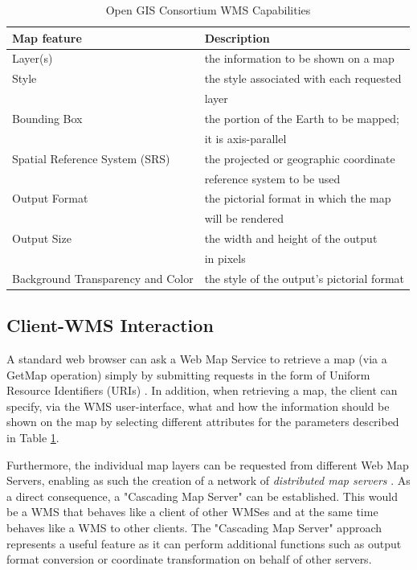 \documentclass[a4paper,11pt,openany,notitlepage]{article}
\begin{document}
\begin{table}[h]
	\centering						
		\begin{tabular}{||l|l||} \hline \hline
			\textbf{Map feature}	& \textbf{Description}	\\ \hline \hline
			Layer(s)	& the information to be shown on a map \\ \hline
			Style		& the style associated with each requested	\\
			&	layer	\\ \hline
			Bounding Box		& the portion of the Earth to be mapped;	\\
			& it is axis-parallel \\ \hline
			Spatial Reference System (SRS)		& the projected or geographic coordinate \\
			&	reference system to be used	\\ \hline				
			Output Format		& the pictorial format in which the map	\\
			&	will be rendered	\\ \hline
			Output Size		& the width and height of the output \\
			&	in pixels	\\ \hline
			Background Transparency and Color	& the style of the output's pictorial format \\ \hline \hline
		\end{tabular}
		\caption{Open GIS Consortium WMS Capabilities}		
		\label{tab:def}
\end{table}

\subsection{Client-WMS Interaction} \label{subsec:interaction}
\indent

A standard web browser can ask a Web Map Service to retrieve a map (via a GetMap operation) simply by submitting requests in the form of Uniform Resource Identifiers (URIs) \cite{ogc}. In addition, when retrieving a map, the client can specify, via the WMS user-interface, what and how the information should be shown on the map by selecting different attributes for the parameters described in Table \ref{tab:def}.

Furthermore, the individual map layers can be requested from different Web Map Servers, enabling as such the creation of a network of \textit{distributed map servers} \cite{ogc}. As a direct consequence, a "Cascading Map Server" \cite{ogc} can be established. This would be a WMS that behaves like a client of other WMSes and at the same time behaves like a WMS to other clients. The "Cascading Map Server" approach represents a useful feature as it can perform additional functions such as output format conversion or coordinate transformation on behalf of other servers.
\end{document}
